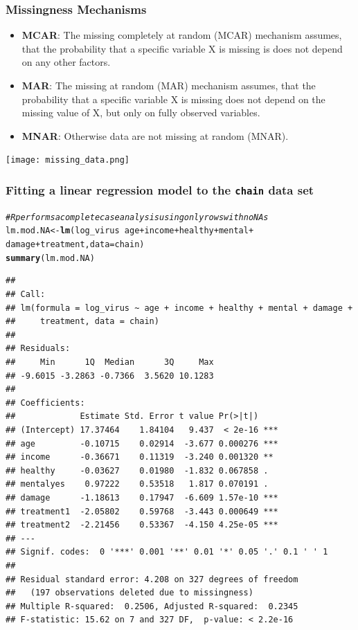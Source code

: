 \documentclass{beamer}\usepackage[]{graphicx}\usepackage[]{color}
\makeatletter
\newcommand{\hlcom}[1]{\textcolor[rgb]{0.678,0.584,0.686}{\textit{#1}}}%
\newcommand{\hlopt}[1]{\textcolor[rgb]{0,0,0}{#1}}%
\newcommand{\hlstd}[1]{\textcolor[rgb]{0.345,0.345,0.345}{#1}}%
\newcommand{\hlkwb}[1]{\textcolor[rgb]{0.69,0.353,0.396}{#1}}%
\newcommand{\hlkwc}[1]{\textcolor[rgb]{0.333,0.667,0.333}{#1}}%
\newcommand{\hlkwd}[1]{\textcolor[rgb]{0.737,0.353,0.396}{\textbf{#1}}}%
\newenvironment{kframe}{%
 \def\at@end@of@kframe{}%
 \ifinner\ifhmode%
  \def\at@end@of@kframe{\end{minipage}}%
  \begin{minipage}{\columnwidth}%
 \fi\fi%
 \def\FrameCommand##1{\hskip\@totalleftmargin \hskip-\fboxsep
 \colorbox{shadecolor}{##1}\hskip-\fboxsep
     \hskip-\linewidth \hskip-\@totalleftmargin \hskip\columnwidth}%
 \MakeFramed {\advance\hsize-\width
   \@totalleftmargin\z@ \linewidth\hsize
   \@setminipage}}%
 {\par\unskip\endMakeFramed%
 \at@end@of@kframe}
\newenvironment{knitrout}{}{} %
\makeatother
\begin{document}
\usebackgroundtemplate{}
\begin{frame}
\frametitle{Missingness Mechanisms}
\begin{itemize}
\item \textbf{MCAR}: The missing completely at random (MCAR) mechanism assumes, that the
probability that a specific variable X is missing is does not depend on any
other factors.
\item \textbf{MAR}: The missing at random (MAR) mechanism assumes, that the probability that
a specific variable X is missing does not depend on the missing value of X,
but only on fully observed variables.
\item \textbf{MNAR}: Otherwise data are not missing at random (MNAR).
\end{itemize}
\begin{center}
\texttt{[image: missing\_data.png]}
\end{center}
\end{frame}

\begin{frame}[fragile]
\frametitle{Fitting a linear regression model to the \texttt{chain} data set}
\begin{knitrout}\tiny
{}\color{fgcolor}\begin{kframe}
\begin{alltt}
\hlcom{# R performs a complete case analysis using only rows with no NAs}
\hlstd{lm.mod.NA} \hlkwb{<-} \hlkwd{lm}\hlstd{(log_virus} \hlopt{~} \hlstd{age} \hlopt{+} \hlstd{income} \hlopt{+} \hlstd{healthy} \hlopt{+} \hlstd{mental} \hlopt{+}
                   \hlstd{damage} \hlopt{+} \hlstd{treatment,} \hlkwc{data} \hlstd{= chain)}
\hlkwd{summary}\hlstd{(lm.mod.NA)}
\end{alltt}
\begin{verbatim}
## 
## Call:
## lm(formula = log_virus ~ age + income + healthy + mental + damage + 
##     treatment, data = chain)
## 
## Residuals:
##     Min      1Q  Median      3Q     Max 
## -9.6015 -3.2863 -0.7366  3.5620 10.1283 
## 
## Coefficients:
##             Estimate Std. Error t value Pr(>|t|)    
## (Intercept) 17.37464    1.84104   9.437  < 2e-16 ***
## age         -0.10715    0.02914  -3.677 0.000276 ***
## income      -0.36671    0.11319  -3.240 0.001320 ** 
## healthy     -0.03627    0.01980  -1.832 0.067858 .  
## mentalyes    0.97222    0.53518   1.817 0.070191 .  
## damage      -1.18613    0.17947  -6.609 1.57e-10 ***
## treatment1  -2.05802    0.59768  -3.443 0.000649 ***
## treatment2  -2.21456    0.53367  -4.150 4.25e-05 ***
## ---
## Signif. codes:  0 '***' 0.001 '**' 0.01 '*' 0.05 '.' 0.1 ' ' 1
## 
## Residual standard error: 4.208 on 327 degrees of freedom
##   (197 observations deleted due to missingness)
## Multiple R-squared:  0.2506,	Adjusted R-squared:  0.2345 
## F-statistic: 15.62 on 7 and 327 DF,  p-value: < 2.2e-16
\end{verbatim}
\end{kframe}
\end{knitrout}
\end{frame}
\end{document}

